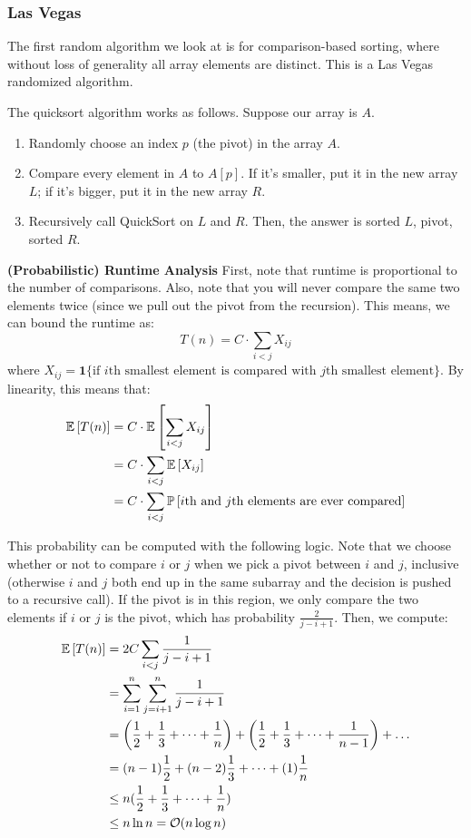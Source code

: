 \subsubsection{Las Vegas}
The first random algorithm we look at is for comparison-based sorting, where without loss of generality all array elements are distinct. This is a Las Vegas randomized algorithm.
\begin{algothm}[QuickSort]
    The quicksort algorithm works as follows. Suppose our array is $A$.
    \begin{enumerate}
        \item Randomly choose an index $p$ (the pivot) in the array $A$.
        \item Compare every element in $A$ to $A[p]$. If it's smaller, put it in the new array $L$; if it's bigger, put it in the new array $R$.
        \item Recursively call QuickSort on $L$ and $R$. Then, the answer is sorted $L$, pivot, sorted $R$.
    \end{enumerate}

    \textbf{(Probabilistic) Runtime Analysis}
    First, note that runtime is proportional to the number of comparisons. Also, note that you will never compare the same two elements twice (since we pull out the pivot from the recursion).
    This means, we can bound the runtime as:
    \[ T(n) = C \cdot \sum_{i < j} X_{ij} \]
    where $X_{ij} = \mathbf{1}\{\text{if $i$th smallest element is compared with $j$th smallest element}\}$. By linearity, this means that:
    \begin{align*}
        \mathbb{E}\left[ T(n) \right] &= C \cdot \mathbb{E}\left[ \sum_{i <j} X_{ij} \right] \\
        &= C \cdot \sum_{i < j} \mathbb{E}\left[ X_{ij} \right] \\
        &= C \cdot \sum_{i < j} \mathbb{P}\left[ \text{$i$th and $j$th elements are ever compared} \right]
    \end{align*}

    This probability can be computed with the following logic. Note that we choose whether or not to compare $i$ or $j$ when we pick a pivot between $i$ and $j$, inclusive (otherwise $i$ and $j$ both end up in the same subarray and the decision is pushed to a recursive call).
    If the pivot is in this region, we only compare the two elements if $i$ or $j$ is the pivot, which has probability $\frac{2}{j - i + 1}$. Then, we compute:
    \begin{align}
        \mathbb{E}\left[ T(n) \right] &= 2C \sum_{i < j} \frac{1}{j - i + 1} \\
        &= \sum_{i = 1}^n \sum_{j = i + 1}^n \frac{1}{j - i + 1} \\
        &= \qty(\frac12 + \frac13 + \dots + \frac{1}{n}) + \qty(\frac12 + \frac13 + \dots + \frac{1}{n - 1}) + \dots \\
        &= (n - 1) \frac12 + (n - 2) \frac13 + \dots + (1) \frac{1}{n} \\
        &\leq n (\frac12 + \frac13 + \dots + \frac{1}{n}) \\
        &\leq n \ln n = \mathcal{O}(n \log n)
    \end{align}


\end{algothm}
